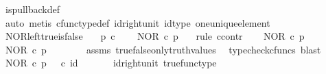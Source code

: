 \begin{isabellebody}
\ is{\isacharunderscore}{\kern0pt}pullback{\isacharunderscore}{\kern0pt}def\ \isanewline
\ \ \isamarkupfalse%
\ {\isacharparenleft}{\kern0pt}auto{\isacharcomma}{\kern0pt}\ metis\ cfunc{\isacharunderscore}{\kern0pt}type{\isacharunderscore}{\kern0pt}def\ id{\isacharunderscore}{\kern0pt}right{\isacharunderscore}{\kern0pt}unit\ id{\isacharunderscore}{\kern0pt}type\ one{\isacharunderscore}{\kern0pt}unique{\isacharunderscore}{\kern0pt}element{\isacharparenright}{\kern0pt}%
\endisatagproof
{\isafoldproof}%
%
\isadelimproof
\isanewline
%
\endisadelimproof
\isanewline
{}\isamarkupfalse%
\ NOR{\isacharunderscore}{\kern0pt}left{\isacharunderscore}{\kern0pt}true{\isacharunderscore}{\kern0pt}is{\isacharunderscore}{\kern0pt}false{\isacharcolon}{\kern0pt}\isanewline
\ \ \ {\isachardoublequoteopen}p\ {\isasymin}\isactrlsub c\ {\isasymOmega}{\isachardoublequoteclose}\isanewline
\ \ \ {\isachardoublequoteopen}NOR\ {\isasymcirc}\isactrlsub c\ {\isasymlangle}{\isasymt}{\isacharcomma}{\kern0pt}p{\isasymrangle}\ {\isacharequal}{\kern0pt}\ {\isasymf}{\isachardoublequoteclose}\isanewline
%
\isadelimproof
%
\endisadelimproof
%
\isatagproof
{}\isamarkupfalse%
\ {\isacharparenleft}{\kern0pt}rule\ ccontr{\isacharparenright}{\kern0pt}\isanewline
\ \ \isamarkupfalse%
\ {\isachardoublequoteopen}NOR\ {\isasymcirc}\isactrlsub c\ {\isasymlangle}{\isasymt}{\isacharcomma}{\kern0pt}p{\isasymrangle}\ {\isasymnoteq}\ {\isasymf}{\isachardoublequoteclose}\isanewline
\ \ \isamarkupfalse%
\ \isamarkupfalse%
\ {\isachardoublequoteopen}NOR\ {\isasymcirc}\isactrlsub c\ {\isasymlangle}{\isasymt}{\isacharcomma}{\kern0pt}p{\isasymrangle}\ {\isacharequal}{\kern0pt}\ {\isasymt}{\isachardoublequoteclose}\isanewline
\ \ \ \ \isamarkupfalse%
\ assms\ true{\isacharunderscore}{\kern0pt}false{\isacharunderscore}{\kern0pt}only{\isacharunderscore}{\kern0pt}truth{\isacharunderscore}{\kern0pt}values\ \isamarkupfalse%
\ {\isacharparenleft}{\kern0pt}typecheck{\isacharunderscore}{\kern0pt}cfuncs{\isacharcomma}{\kern0pt}\ blast{\isacharparenright}{\kern0pt}\isanewline
\ \ \isamarkupfalse%
\ \isamarkupfalse%
\ {\isachardoublequoteopen}NOR\ {\isasymcirc}\isactrlsub c\ {\isasymlangle}{\isasymt}{\isacharcomma}{\kern0pt}p{\isasymrangle}\ {\isacharequal}{\kern0pt}\ {\isasymt}\ {\isasymcirc}\isactrlsub c\ id\ {\isasymone}{\isachardoublequoteclose}\isanewline
\ \ \ \ \isamarkupfalse%
\ id{\isacharunderscore}{\kern0pt}right{\isacharunderscore}{\kern0pt}unit{}\ true{\isacharunderscore}{\kern0pt}func{\isacharunderscore}{\kern0pt}type\ \isamarkupfalse%

\end{isabellebody}
